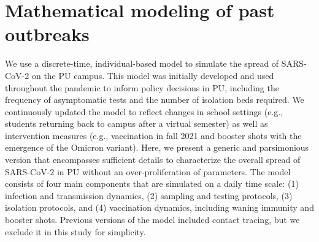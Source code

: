 \documentclass[12pt]{article}
\newcommand{\fref}[1]{Fig.~\ref{fig:#1}}
\begin{document}

\section*{Mathematical modeling of past outbreaks}

We use a discrete-time, individual-based model to simulate the spread of SARS-CoV-2 on the PU campus.
This model was initially developed and used throughout the pandemic to inform policy decisions in PU, including the frequency of asymptomatic tests and the number of isolation beds required.
We continuously updated the model to reflect changes in school settings (e.g., students returning back to campus after a virtual semester) as well as intervention measures (e.g., vaccination in fall 2021 and booster shots with the emergence of the Omicron variant).
Here, we present a generic and parsimonious version that encompasses sufficient details to characterize the overall spread of SARS-CoV-2 in PU without an over-proliferation of parameters.
The model consists of four main components that are simulated on a daily time scale: (1) infection and transmission dynamics, (2) sampling and testing protocols, (3) isolation protocols, and (4) vaccination dynamics, including waning immunity and booster shots.
Previous versions of the model included contact tracing, but we exclude it in this study for simplicity.
\end{document}
